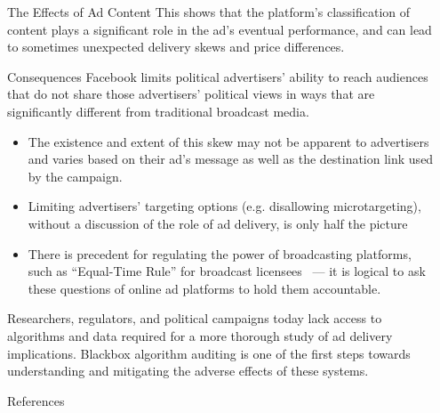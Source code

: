 \documentclass[final,hyperref={pdfpagelabels=false}]{beamer}
\begin{document}
\begin{frame}[t]
\begin{columns}[t]
\begin{column}{.45\textwidth}
\begin{block}{\Large The Effects of Ad Content}
        This shows that the platform's classification of content plays a significant role in the ad's eventual performance, and can lead to sometimes unexpected delivery skews and price differences.
      \end{block}

      \begin{block}{\Large Consequences}
        Facebook limits political advertisers’ ability to reach audiences that do not share those advertisers’ political views in ways that are significantly different from traditional broadcast media.\vspace{1em}

      \begin{itemize}
        \item The existence and extent of this skew may not be apparent to advertisers and varies based on their ad’s message as well as the destination link used by the campaign.\vspace{1em}
        \item Limiting advertisers' targeting options (e.g. disallowing microtargeting), without a discussion of the role of ad delivery, is only half the picture\vspace{1em}
        \item There is precedent for regulating the power of broadcasting platforms, such as ``Equal-Time Rule'' for broadcast licensees~\cite{EqualTimeRule} --- it is logical to ask these questions of online ad platforms to hold them accountable.\vspace{1em}
      \end{itemize}

      Researchers, regulators, and political campaigns today lack access to algorithms and data required for a more thorough study of ad delivery implications.
      Blackbox algorithm auditing is one of the first steps towards understanding and mitigating the adverse effects of these systems.
      \end{block}

      \begin{block}{\Large References}
        \nocite{*} %
        \linespread{0.928}\selectfont
        \footnotesize{
          }
      \end{block}

    \end{column} %


    \begin{column}{.02\textwidth}\end{column} %

  \end{columns} %
\end{frame} %
\end{document}
